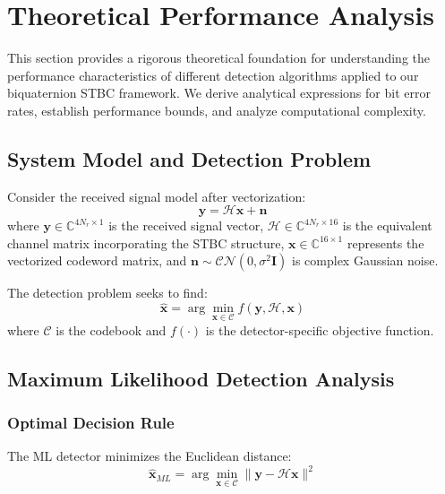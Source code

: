 \section{Theoretical Performance Analysis}

This section provides a rigorous theoretical foundation for understanding the performance characteristics of different detection algorithms applied to our biquaternion STBC framework. We derive analytical expressions for bit error rates, establish performance bounds, and analyze computational complexity.

\subsection{System Model and Detection Problem}

Consider the received signal model after vectorization:
\begin{equation}
\mathbf{y} = \mathcal{H}\mathbf{x} + \mathbf{n}
\end{equation}
where $\mathbf{y} \in \mathbb{C}^{4N_r \times 1}$ is the received signal vector, $\mathcal{H} \in \mathbb{C}^{4N_r \times 16}$ is the equivalent channel matrix incorporating the STBC structure, $\mathbf{x} \in \mathbb{C}^{16 \times 1}$ represents the vectorized codeword matrix, and $\mathbf{n} \sim \mathcal{CN}(0, \sigma^2 \mathbf{I})$ is complex Gaussian noise.

The detection problem seeks to find:
\begin{equation}
\hat{\mathbf{x}} = \arg \min_{\mathbf{x} \in \mathcal{C}} f(\mathbf{y}, \mathcal{H}, \mathbf{x})
\end{equation}
where $\mathcal{C}$ is the codebook and $f(\cdot)$ is the detector-specific objective function.

\subsection{Maximum Likelihood Detection Analysis}

\subsubsection{Optimal Decision Rule}
The ML detector minimizes the Euclidean distance:
\begin{equation}
\hat{\mathbf{x}}_{ML} = \arg \min_{\mathbf{x} \in \mathcal{C}} \|\mathbf{y} - \mathcal{H}\mathbf{x}\|^2
\end{equation}

